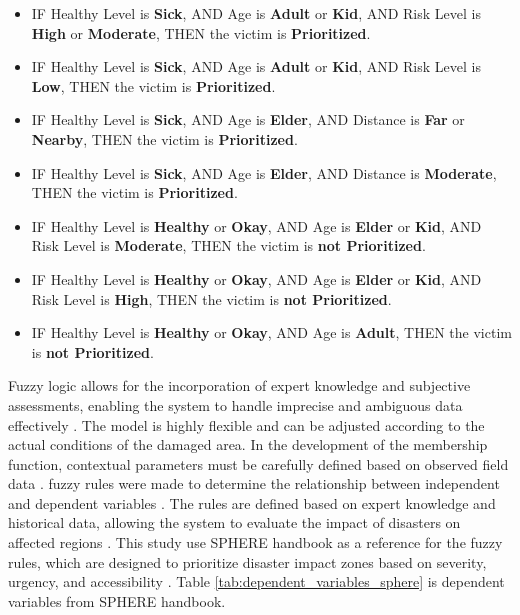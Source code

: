 \documentclass[journal,final,a4paper,twoside,11pt]{IEEEtran}
\begin{document}
\begin{itemize}
    \item IF Healthy Level is \textbf{Sick}, AND Age is \textbf{Adult} or \textbf{Kid}, AND Risk Level is \textbf{High} or \textbf{Moderate}, THEN the victim is \textbf{Prioritized}.
    
    \item IF Healthy Level is \textbf{Sick}, AND Age is \textbf{Adult} or \textbf{Kid}, AND Risk Level is \textbf{Low}, THEN the victim is \textbf{Prioritized}.
    
    \item IF Healthy Level is \textbf{Sick}, AND Age is \textbf{Elder}, AND Distance is \textbf{Far} or \textbf{Nearby}, THEN the victim is \textbf{Prioritized}.
    
    \item IF Healthy Level is \textbf{Sick}, AND Age is \textbf{Elder}, AND Distance is \textbf{Moderate}, THEN the victim is \textbf{Prioritized}.
    
    \item IF Healthy Level is \textbf{Healthy} or \textbf{Okay}, AND Age is \textbf{Elder} or \textbf{Kid}, AND Risk Level is \textbf{Moderate}, THEN the victim is \textbf{not Prioritized}.
    
    \item IF Healthy Level is \textbf{Healthy} or \textbf{Okay}, AND Age is \textbf{Elder} or \textbf{Kid}, AND Risk Level is \textbf{High}, THEN the victim is \textbf{not Prioritized}.
    
    \item IF Healthy Level is \textbf{Healthy} or \textbf{Okay}, AND Age is \textbf{Adult}, THEN the victim is \textbf{not Prioritized}.
\end{itemize}

Fuzzy logic allows for the incorporation of expert knowledge and subjective assessments, enabling the system to handle imprecise and ambiguous data effectively \cite{jain2020membership}. The model is highly flexible and can be adjusted according to the actual conditions of the damaged area. In the development of the membership function, contextual parameters must be carefully defined based on observed field data \cite{amiri2021application}. fuzzy rules were made to determine the relationship between independent and dependent variables \cite{yoon2023novel}. The rules are defined based on expert knowledge and historical data, allowing the system to evaluate the impact of disasters on affected regions \cite{wang2024gis}. This study use SPHERE handbook as a reference for the fuzzy rules, which are designed to prioritize disaster impact zones based on severity, urgency, and accessibility \cite{sphere2018pdf}. Table \ref{tab:dependent_variables_sphere} is dependent variables from SPHERE handbook.
\end{document}
